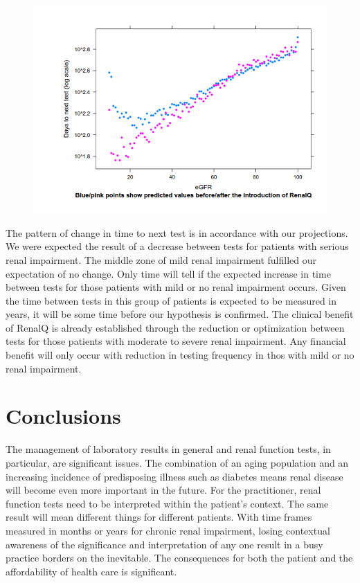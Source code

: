 ﻿\documentclass[11pt]{article}
\begin{document}
\begin{figure}[htp]
\centering
\includegraphics[scale=0.50]{FigCritical.png}
\caption{}
\label{}
\end{figure}

The pattern of change in time to next test is in accordance with our projections. We were expected the result of a decrease between tests for patients with serious renal impairment. The middle zone of mild renal impairment fulfilled our expectation of no change. Only time will tell if the expected increase in time between tests for those patients with mild or no renal impairment occurs. Given the time between tests in this group of patients is expected to be measured in years, it will be some time before our hypothesis is confirmed. The clinical benefit of RenalQ is already established through the reduction or optimization between tests for those patients with moderate to severe renal impairment. Any financial benefit will only occur with reduction in testing frequency in thos with mild or no renal impairment.

\section{Conclusions}
The management of laboratory results in general and renal function tests, in particular, are significant issues. The combination of an aging population and an increasing incidence of predisposing illness such as diabetes means renal disease will become even more important in the future. For the practitioner, renal function tests need to be interpreted within the patient's context. The same result will mean different things for different patients. With time frames measured in months or years for chronic renal impairment, losing contextual awareness of the significance and interpretation of any one result in a busy practice borders on the inevitable. The consequences for both the patient and the affordability of health care is significant.\\
\end{document}
